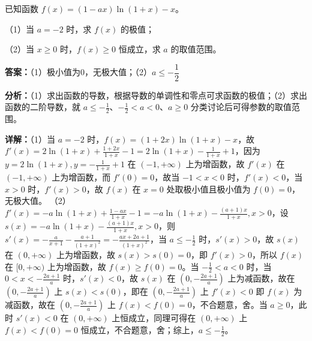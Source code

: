 \begin{question}[points=12]
已知函数 $f(x)=(1-ax)\ln(1+x)-x$。

（1）当 $a=-2$ 时，求 $f(x)$ 的极值；

（2）当 $x\ge0$ 时，$f(x)\ge0$ 恒成立，求 $a$ 的取值范围。
\begin{solution}
\textbf{答案：}（1）极小值为0，无极大值；（2）$a\le -\dfrac{1}{2}$

\textbf{分析：}（1）求出函数的导数，根据导数的单调性和零点可求函数的极值；（2）求出函数的二阶导数，就 $a\le -\frac{1}{2}$、$-\frac{1}{2}<a<0$、$a\ge0$ 分类讨论后可得参数的取值范围。

\textbf{详解：}（1）当 $a=-2$ 时，$f(x)=(1+2x)\ln(1+x)-x$，故 $f'(x)=2\ln(1+x)+\frac{1+2x}{1+x}-1=2\ln(1+x)-\frac{1}{1+x}+1$，因为 $y=2\ln(1+x),y=-\frac{1}{1+x}+1$ 在 $(-1,+\infty)$ 上为增函数，故 $f'(x)$ 在 $(-1,+\infty)$ 上为增函数，而 $f'(0)=0$，故当 $-1<x<0$ 时，$f'(x)<0$，当 $x>0$ 时，$f'(x)>0$，故 $f(x)$ 在 $x=0$ 处取极小值且极小值为 $f(0)=0$，无极大值。
（2）$f'(x)=-a\ln(1+x)+\frac{1-ax}{1+x}-1=-a\ln(1+x)-\frac{(a+1)x}{1+x},x>0$，设 $s(x)=-a\ln(1+x)-\frac{(a+1)x}{1+x},x>0$，则 $s'(x)=-\frac{a}{x+1}-\frac{a+1}{(1+x)^2}=-\frac{ax+2a+1}{(1+x)^2}$，当 $a\le -\frac{1}{2}$ 时，$s'(x)>0$，故 $s(x)$ 在 $(0,+\infty)$ 上为增函数，故 $s(x)>s(0)=0$，即 $f'(x)>0$，所以 $f(x)$ 在 $[0,+\infty)$ 上为增函数，故 $f(x)\ge f(0)=0$。当 $-\frac{1}{2}<a<0$ 时，当 $0<x<-\frac{2a+1}{a}$ 时，$s'(x)<0$，故 $s(x)$ 在 $(0,-\frac{2a+1}{a})$ 上为减函数，故在 $(0,-\frac{2a+1}{a})$ 上 $s(x)<s(0)$，即在 $(0,-\frac{2a+1}{a})$ 上 $f'(x)<0$ 即 $f(x)$ 为减函数，故在 $(0,-\frac{2a+1}{a})$ 上 $f(x)<f(0)=0$，不合题意，舍。当 $a\ge0$，此时 $s'(x)<0$ 在 $(0,+\infty)$ 上恒成立，同理可得在 $(0,+\infty)$ 上 $f(x)<f(0)=0$ 恒成立，不合题意，舍；综上，$a\le -\frac{1}{2}$。
\end{solution}
\end{question}


